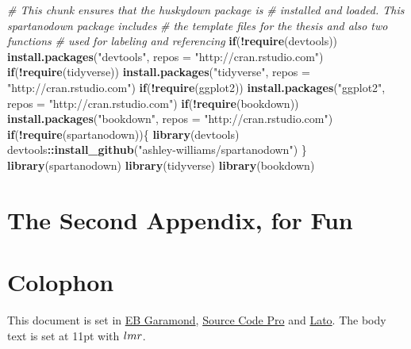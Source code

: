 \documentclass[ms]{uncgdissertationexp}
\newenvironment{Shaded}{\begin{snugshade}}{\end{snugshade}}
\newcommand{\KeywordTok}[1]{\textcolor[rgb]{0.13,0.29,0.53}{\textbf{#1}}}
\newcommand{\DataTypeTok}[1]{\textcolor[rgb]{0.13,0.29,0.53}{#1}}
\newcommand{\StringTok}[1]{\textcolor[rgb]{0.31,0.60,0.02}{#1}}
\newcommand{\CommentTok}[1]{\textcolor[rgb]{0.56,0.35,0.01}{\textit{#1}}}
\newcommand{\ControlFlowTok}[1]{\textcolor[rgb]{0.13,0.29,0.53}{\textbf{#1}}}
\newcommand{\OperatorTok}[1]{\textcolor[rgb]{0.81,0.36,0.00}{\textbf{#1}}}
\newcommand{\NormalTok}[1]{#1}
\theoremstyle{plain}
\theoremstyle{definition}
\theoremstyle{remark}
\begin{document}
  \begin{Shaded}
  \begin{Highlighting}[]
  \CommentTok{# This chunk ensures that the huskydown package is}
  \CommentTok{# installed and loaded. This spartanodown package includes}
  \CommentTok{# the template files for the thesis and also two functions}
  \CommentTok{# used for labeling and referencing}
  \ControlFlowTok{if}\NormalTok{(}\OperatorTok{!}\KeywordTok{require}\NormalTok{(devtools))}
    \KeywordTok{install.packages}\NormalTok{(}\StringTok{"devtools"}\NormalTok{, }\DataTypeTok{repos =} \StringTok{"http://cran.rstudio.com"}\NormalTok{)}
  \ControlFlowTok{if}\NormalTok{(}\OperatorTok{!}\KeywordTok{require}\NormalTok{(tidyverse))}
      \KeywordTok{install.packages}\NormalTok{(}\StringTok{"tidyverse"}\NormalTok{, }\DataTypeTok{repos =} \StringTok{"http://cran.rstudio.com"}\NormalTok{)}
  \ControlFlowTok{if}\NormalTok{(}\OperatorTok{!}\KeywordTok{require}\NormalTok{(ggplot2))}
      \KeywordTok{install.packages}\NormalTok{(}\StringTok{"ggplot2"}\NormalTok{, }\DataTypeTok{repos =} \StringTok{"http://cran.rstudio.com"}\NormalTok{)}
  \ControlFlowTok{if}\NormalTok{(}\OperatorTok{!}\KeywordTok{require}\NormalTok{(bookdown))}
      \KeywordTok{install.packages}\NormalTok{(}\StringTok{"bookdown"}\NormalTok{, }\DataTypeTok{repos =} \StringTok{"http://cran.rstudio.com"}\NormalTok{)}
  \ControlFlowTok{if}\NormalTok{(}\OperatorTok{!}\KeywordTok{require}\NormalTok{(spartanodown))\{}
    \KeywordTok{library}\NormalTok{(devtools)}
  \NormalTok{  devtools}\OperatorTok{::}\KeywordTok{install_github}\NormalTok{(}\StringTok{"ashley-williams/spartanodown"}\NormalTok{)}
  \NormalTok{  \}}
  \KeywordTok{library}\NormalTok{(spartanodown)}
  \KeywordTok{library}\NormalTok{(tidyverse)}
  \KeywordTok{library}\NormalTok{(bookdown)}
  \end{Highlighting}
  \end{Shaded}
  \chapter{The Second Appendix, for
  Fun}\label{the-second-appendix-for-fun}
  
  \chapter*{Colophon}\label{colophon}
  
  This document is set in \href{https://github.com/georgd/EB-Garamond}{EB
  Garamond}, \href{https://github.com/adobe-fonts/source-code-pro/}{Source
  Code Pro} and \href{http://www.latofonts.com/lato-free-fonts/}{Lato}.
  The body text is set at 11pt with \(\familydefault\).
  
\end{document}
